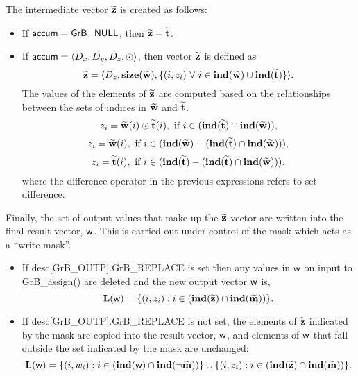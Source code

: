The intermediate vector ${\bf \widetilde{z}}$ is created as follows:
\begin{itemize}
    \item If ${\sf accum} = {\sf GrB\_NULL}$, then 
    ${\bf \widetilde{z}} = {\bf \widetilde{t}}$.

    \item If ${\sf accum} = \langle D_x, D_y, D_z, \odot \rangle$, then vector 
    ${\bf \widetilde{z}}$ is defined as 
        \[
        {\bf \widetilde{z}} = 
        \langle D_z, \bold{size}({\bf \widetilde{w}}), 
		\{(i,z_{i}) \ \forall \ i \in \bold{ind}({\bf \widetilde{w}}) \cup 
        \bold{ind}({\bf \widetilde{t}}) \} \rangle.\]
    The values of the elements of ${\bf \widetilde{z}}$ are computed based 
    on the relationships between the sets of indices in ${\bf \widetilde{w}}$ 
    and ${\bf \widetilde{t}}$.
\[
    z_{i} = {\bf \widetilde{w}}(i) \odot {\bf \widetilde{t}}(i), \ \mbox{if}\  
    i \in  (\bold{ind}({\bf \widetilde{t}}) \cap \bold{ind}({\bf \widetilde{w}})),
\]
\[
    z_{i} = {\bf \widetilde{w}}(i), \ \mbox{if}\  
    i \in  (\bold{ind}({\bf \widetilde{w}}) - (\bold{ind}({\bf \widetilde{t}})
    \cap \bold{ind}({\bf \widetilde{w}}))),
\]
\[
    z_{i} = {\bf \widetilde{t}}(i), \ \mbox{if}\  i \in  
    (\bold{ind}({\bf \widetilde{t}}) - (\bold{ind}({\bf \widetilde{t}}) 
    \cap \bold{ind}({\bf \widetilde{w}}))).
\]
where the difference operator in the previous expressions refers to set difference.
\end{itemize}

Finally, the set of output values that make up the ${\bf \widetilde{z}}$ 
vector are written into the final result vector, ${\sf w}$. 
This is carried out under control of the mask which acts as a ``write mask''.
\begin{itemize}
\item If {\sf desc[GrB\_OUTP].GrB\_REPLACE} is set then any values in ${\sf w}$ 
on input to {\sf GrB\_assign()} are deleted and the new output vector ${\sf w}$ is,
\[ \bold{L}({\sf w}) = \{(i,z_{i}) : i \in (\bold{ind}({\bf \widetilde{z}}) 
\cap \bold{ind}({\bf \widetilde{m}})) \}. \]

\item If {\sf desc[GrB\_OUTP].GrB\_REPLACE} is not set, the elements of 
${\bf \widetilde{z}}$ indicated by 
the mask are copied into the result vector, ${\sf w}$, and elements of 
${\sf w}$ that fall outside the set indicated by the mask are unchanged:
\[ \bold{L}({\sf w}) = \{(i,w_{i}) : i \in (\bold{ind}({\bf \sf w}) 
\cap \bold{ind}(\neg {\bf \widetilde{m}})) \} \cup \{(i,z_{i}) : i \in 
(\bold{ind}({\bf \widetilde{z}}) \cap \bold{ind}({\bf \widetilde{m}})) \}. \]
\end{itemize}

